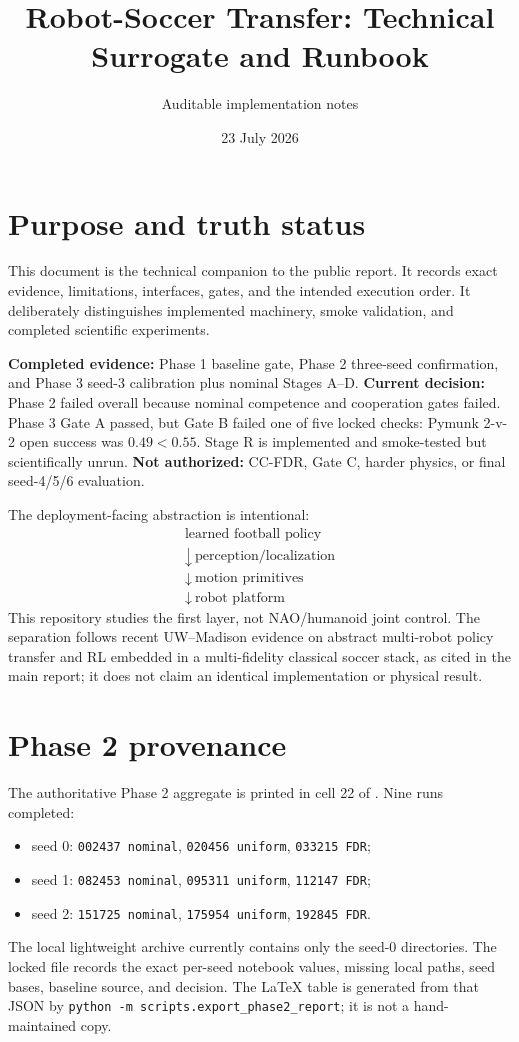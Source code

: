 \documentclass[12pt,twocolumn]{article}
\title{\vspace{-1.2em}Robot-Soccer Transfer: Technical Surrogate and Runbook}
\author{Auditable implementation notes}
\date{23 July 2026}
\begin{document}
\maketitle

\section{Purpose and truth status}
This document is the technical companion to the public report. It records exact evidence,
limitations, interfaces, gates, and the intended execution order. It deliberately distinguishes
implemented machinery, smoke validation, and completed scientific experiments.

\textbf{Completed evidence:} Phase 1 baseline gate, Phase 2 three-seed confirmation, and Phase 3
seed-3 calibration plus nominal Stages A--D.
\textbf{Current decision:} Phase 2 failed overall because nominal competence and cooperation gates
failed. Phase 3 Gate A passed, but Gate B failed one of five locked checks: Pymunk 2-v-2 open
success was $0.49<0.55$. Stage R is implemented and smoke-tested but scientifically unrun.
\textbf{Not authorized:} CC-FDR, Gate C, harder physics, or final seed-4/5/6 evaluation.

The deployment-facing abstraction is intentional:
\[
\begin{gathered}
\text{learned football policy}\\[-0.2em]
\downarrow\ \text{perception/localization}\\[-0.2em]
\downarrow\ \text{motion primitives}\\[-0.2em]
\downarrow\ \text{robot platform}
\end{gathered}
\]
This repository studies the first layer, not NAO/humanoid joint control. The separation follows
recent UW--Madison evidence on abstract multi-robot policy transfer and RL embedded in a
multi-fidelity classical soccer stack, as cited in the main report; it does not claim an identical
implementation or physical result.

\section{Phase 2 provenance}
The authoritative Phase 2 aggregate is printed in cell 22 of
. Nine runs completed:
\begin{itemize}
\item seed 0: \texttt{002437 nominal}, \texttt{020456 uniform}, \texttt{033215 FDR};
\item seed 1: \texttt{082453 nominal}, \texttt{095311 uniform}, \texttt{112147 FDR};
\item seed 2: \texttt{151725 nominal}, \texttt{175954 uniform}, \texttt{192845 FDR}.
\end{itemize}
The local lightweight archive currently contains only the seed-0 directories. The locked file
 records the exact per-seed notebook values,
missing local paths, seed bases, baseline source, and decision. The LaTeX table is generated from
that JSON by \texttt{python -m scripts.export\_phase2\_report}; it is not a hand-maintained copy.
\end{document}
